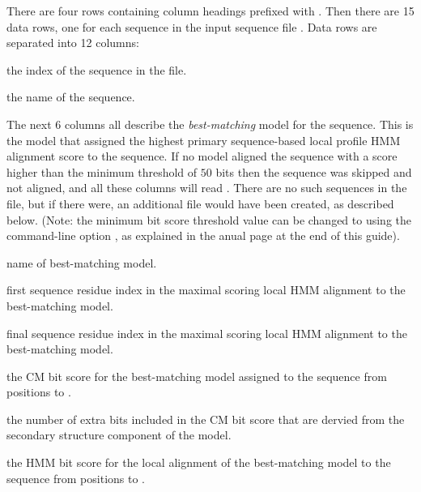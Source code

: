 There are four rows containing column headings prefixed with
\prog{\#}. Then there are 15 data rows, one for each sequence in the
input sequence file . Data rows are
separated into 12 columns:

\begin{wideitem}
\item[\emprog{idx}] the index of the sequence in the file.

\item[\emprog{sequence name}] the name of the sequence.
\end{wideitem}

The next 6 columns all describe the \emph{best-matching} model for the
sequence. This is the model that assigned the highest primary
sequence-based local profile HMM alignment score to the sequence.  If
no model aligned the sequence with a score higher than the minimum
threshold of $50$ bits then the sequence was skipped and not aligned,
and all these columns will read \prog{-}. There are no such sequences
in the  file, but if there were, an additional
 file would have been created, as described
below. (Note: the minimum bit score
threshold value can be changed to  using the
 command-line option , as explained in
the  anual page at the end of this guide).

\begin{wideitem}
\item[\emprog{model name}] name of best-matching model.

\item[\emprog{beg}] first sequence residue index in the maximal
  scoring local HMM alignment to the best-matching model.

\item[\emprog{end}] final sequence residue index in the maximal
  scoring local HMM alignment to the best-matching model.

\item[\emprog{CM sc}] the CM bit score for the best-matching model
  assigned to the sequence from positions  to .

\item[\emprog{struct}] the number of extra bits included in the
  CM bit score that are dervied from the secondary structure component
  of the model.

\item[\emprog{HMM sc}] the HMM bit score for the local alignment of
  the best-matching model to the sequence from positions  to
  .
\end{wideitem}

